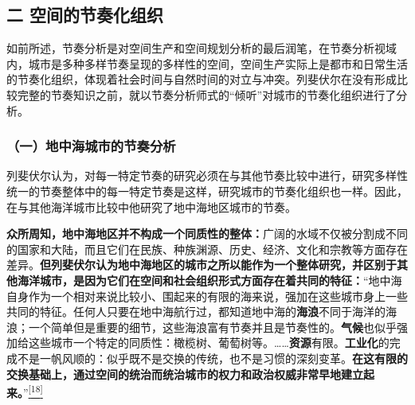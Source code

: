 \documentclass[UTF8, fontset = sourcesans, a4paper, oneside, zihao =
-4, scheme=chinese, no-math, space=true]{ctexbook}
\begin{document}
\subsection{二
空间的节奏化组织}\label{part0009_split_002.htmlux5cux23c049}

如前所述，节奏分析是对空间生产和空间规划分析的最后润笔，在节奏分析视域内，城市是多种多样节奏呈现的多样性的空间，空间生产实际上是都市和日常生活的节奏化组织，体现着社会时间与自然时间的对立与冲突。列斐伏尔在没有形成比较完整的节奏知识之前，就以节奏分析师式的``倾听''对城市的节奏化组织进行了分析。

\subsubsection{（一）地中海城市的节奏分析}\label{part0009_split_002.htmlux5cux23d033}

列斐伏尔认为，对每一特定节奏的研究必须在与其他节奏比较中进行，研究多样性统一的节奏整体中的每一特定节奏是这样，研究城市的节奏化组织也一样。因此，在与其他海洋城市比较中他研究了地中海地区城市的节奏。

\textbf{众所周知，地中海地区并不构成一个同质性的整体：}广阔的水域不仅被分割成不同的国家和大陆，而且它们在民族、种族渊源、历史、经济、文化和宗教等方面存在差异。\textbf{但列斐伏尔认为地中海地区的城市之所以能作为一个整体研究，并区别于其他海洋城市，是因为它们在空间和社会组织形式方面存在着共同的特征：}``地中海自身作为一个相对来说比较小、围起来的有限的海来说，强加在这些城市身上一些共同的特征。任何人只要在地中海航行过，都知道地中海的\textbf{海浪}不同于海洋的海浪；一个简单但是重要的细节，这些海浪富有节奏并且是节奏性的。\textbf{气候}也似乎强加给这些城市一个特定的同质性：橄榄树、葡萄树等。……\textbf{资源}有限。\textbf{工业化}的完成不是一帆风顺的：似乎既不是交换的传统，也不是习惯的深刻变革。\textbf{在这有限的交换基础上，通过空间的统治而统治城市的权力和政治权威非常早地建立起来。}''\protect\hypertarget{part0009_split_002.htmlux5cux23w18}{}{}\protect\hyperlink{part0009_split_004.htmlux5cux23m18}{\textsuperscript{{[}18{]}}}
\end{document}
